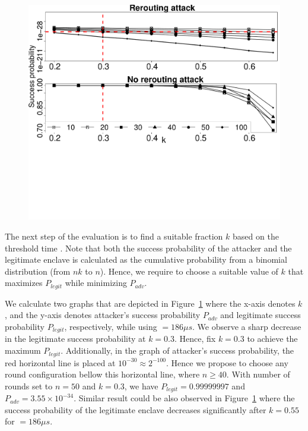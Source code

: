 \begin{figure}[t]
  \centering
    \includegraphics[trim={0 10cm 0 0}, clip, width=\linewidth]{data/fx3_data/round_comp_new.pdf}
    \caption{\roundCompCaption}
    \label{graph:roundSuccess}
\end{figure}


 The next step of the evaluation is to find a suitable fraction $k$ based on the threshold time \connect. Note that both the success probability of the attacker and the legitimate enclave is calculated as the cumulative probability from a binomial distribution (from $nk$ to $n$). Hence, we require to choose a suitable value of $k$ that maximizes $P_{legit}$ while minimizing $P_{adv}$.

We calculate two graphs that are depicted in Figure~\ref{graph:roundSuccess} where the x-axis denotes $k$, and the y-axis denotes attacker's success probability $P_{adv}$ and legitimate success probability $P_{legit}$, respectively, while using \connect$=186 \mu s$. We observe a sharp decrease in the legitimate success probability at $k=0.3$. Hence, fix $k=0.3$ to achieve the maximum $P_{legit}$. Additionally, in the graph of attacker's success probability, the red horizontal line is placed at $10^{-30} \approx 2^{-100}$. Hence we propose to choose any round configuration bellow this horizontal line, where $n \geq 40$. With number of rounds set to $n=50$ and $k=0.3$, we have $P_{legit}=0.99999997$ and $P_{adv}=3.55\times 10^{-34}$. Similar result could be also observed in Figure~\ref{graph:roundSuccess} where the success probability of the legitimate enclave decreases significantly after $k=0.55$ for \connect$=186\mu s$.



